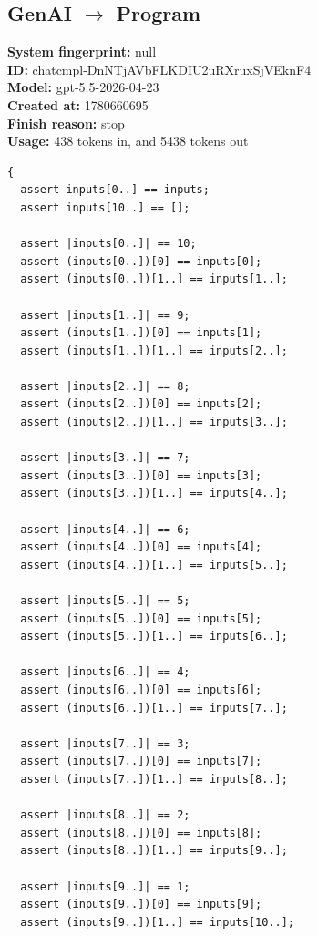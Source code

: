 \documentclass{article}
\begin{document}
\subsection*{GenAI $\rightarrow$ Program}
\textbf{System fingerprint: }null
\\\textbf{ID: }chatcmpl-DnNTjAVbFLKDIU2uRXruxSjVEknF4
\\\textbf{Model: }gpt-5.5-2026-04-23
\\\textbf{Created at: }1780660695
\\\textbf{Finish reason: }stop
\\\textbf{Usage: }438 tokens in, and 5438 tokens out
\begin{lstlisting}
{
  assert inputs[0..] == inputs;
  assert inputs[10..] == [];

  assert |inputs[0..]| == 10;
  assert (inputs[0..])[0] == inputs[0];
  assert (inputs[0..])[1..] == inputs[1..];

  assert |inputs[1..]| == 9;
  assert (inputs[1..])[0] == inputs[1];
  assert (inputs[1..])[1..] == inputs[2..];

  assert |inputs[2..]| == 8;
  assert (inputs[2..])[0] == inputs[2];
  assert (inputs[2..])[1..] == inputs[3..];

  assert |inputs[3..]| == 7;
  assert (inputs[3..])[0] == inputs[3];
  assert (inputs[3..])[1..] == inputs[4..];

  assert |inputs[4..]| == 6;
  assert (inputs[4..])[0] == inputs[4];
  assert (inputs[4..])[1..] == inputs[5..];

  assert |inputs[5..]| == 5;
  assert (inputs[5..])[0] == inputs[5];
  assert (inputs[5..])[1..] == inputs[6..];

  assert |inputs[6..]| == 4;
  assert (inputs[6..])[0] == inputs[6];
  assert (inputs[6..])[1..] == inputs[7..];

  assert |inputs[7..]| == 3;
  assert (inputs[7..])[0] == inputs[7];
  assert (inputs[7..])[1..] == inputs[8..];

  assert |inputs[8..]| == 2;
  assert (inputs[8..])[0] == inputs[8];
  assert (inputs[8..])[1..] == inputs[9..];

  assert |inputs[9..]| == 1;
  assert (inputs[9..])[0] == inputs[9];
  assert (inputs[9..])[1..] == inputs[10..];


\end{lstlisting}
\end{document}
